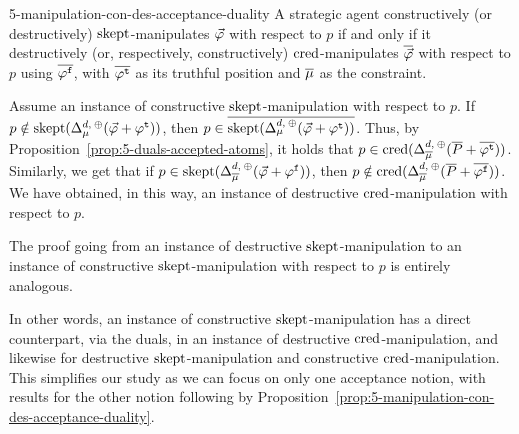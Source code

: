 \begin{prp}{}{5-manipulation-con-des-acceptance-duality}
	A strategic agent constructively (or destructively) 
	$\skept$-manipulates $\P$ with respect to $p$ if and only if
	it destructively (or, respectively, constructively) $\cred$-manipulates $\dual{\P}$ 
	with respect to $p$ using $\dual{\manip{\phi}}$, 
	with $\dual{\truth{\phi}}$ as its truthful position and $\dual{\mu}$ as the constraint.
\end{prp}
\begin{prf*}{}{}%
	Assume an instance of constructive $\skept$-manipulation with respect to $p$.
	If $p\notin\skept(\me^{\dd,\:\agg}_{\mu}(\P+\truth{\phi}))$, 
	then $p\in\dual{\skept(\me^{\dd,\:\agg}_{\mu}(\P+\truth{\phi}))}$.
	Thus, by Proposition~\ref{prop:5-duals-accepted-atoms},
	it holds that $p\in\cred(\me^{\dd,\:\agg}_{\dual{\mu}}(\dual{P}+\dual{\truth{\phi}}))$.
	Similarly, we get that if $p\in\skept(\me^{\dd,\:\agg}_{\dual{\mu}}({\P+\manip{\phi}}))$,
	then $p\notin\cred(\me^{\dd,\:\agg}_{\dual{\mu}}(\dual{P}+\dual{\manip{\phi}}))$.
	We have obtained, in this way, an instance of destructive $\cred$-manipulation with respect to $p$.
	
	The proof going from an instance of destructive $\skept$-manipulation to an instance of 
	constructive $\skept$-manipulation with respect to $p$ is entirely analogous.
\end{prf*}

In other words, an instance of constructive $\skept$-manipulation 
has a direct counterpart, via the duals,
in an instance of destructive $\cred$-manipulation, 
and likewise for destructive $\skept$-manipulation and constructive $\cred$-manipulation.
This simplifies our study as we can focus on only one acceptance notion, with results for 
the other notion following by Proposition~\ref{prop:5-manipulation-con-des-acceptance-duality}.

